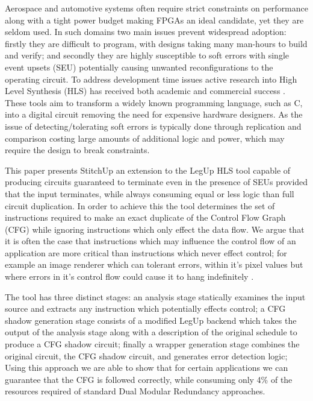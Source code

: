 
Aerospace and automotive systems often require strict constraints on performance
along with a tight power budget making FPGAs an ideal candidate, yet they are seldom used.
In such domains two main issues prevent widespread adoption: firstly they are difficult
to program, with designs taking many man-hours to build and verify;
and secondly they are highly susceptible to soft errors with single event upsets (SEU)
potentially causing unwanted reconfigurations to the operating circuit.
To address development time issues active research into High Level Synthesis (HLS) has received both academic and
commercial success \cite{feist2012vivado}. These tools aim to transform a widely known programming language, such as C,
into a digital circuit removing the need for expensive hardware designers.
As the issue of detecting/tolerating soft errors is typically done through replication and comparison
costing large amounts of additional logic and power, which may require the design to break constraints.


This paper presents StitchUp an extension to the LegUp HLS tool \cite{canis2011legup} capable of producing circuits
guaranteed to terminate even in the presence of SEUs provided that the input terminates, while always consuming equal
or less logic than full circuit duplication.
In order to achieve this the tool determines the set of instructions required to make an exact duplicate of the Control
Flow Graph (CFG) while ignoring instructions which only effect the data flow.
We argue that it is often the case that instructions which may influence the control flow of an application are more critical
than instructions which never effect control; for example an image renderer which can tolerant errors, within
it's pixel values but where errors in it's control flow could cause it to hang indefinitely \cite{sampson2011enerj}.

The tool has three distinct stages: an analysis stage statically examines the input source and extracts any instruction
which potentially effects control; a CFG shadow generation stage consists of a modified LegUp backend
which takes the output of the analysis stage along with a description of the original schedule to produce a CFG shadow circuit;
finally a wrapper generation stage combines the original circuit, the CFG shadow circuit, and generates error detection logic;
Using this approach we are able to show that for certain applications we can guarantee that the CFG
is followed correctly, while consuming only 4\% of the resources required of standard Dual Modular Redundancy approaches.

